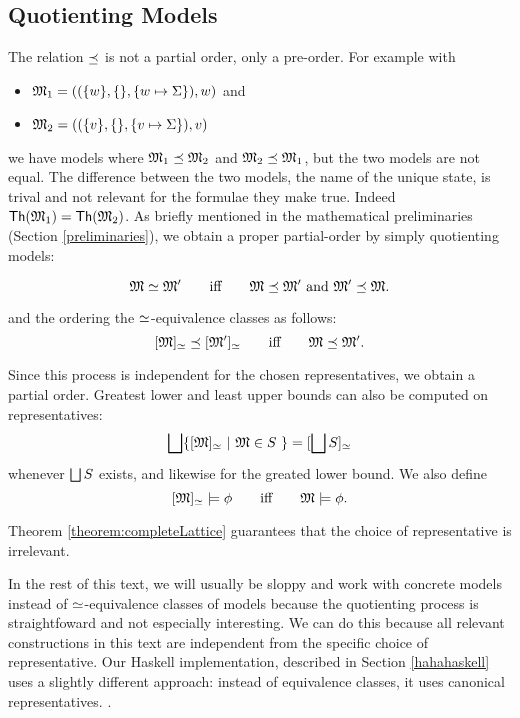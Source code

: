 \subsection{Quotienting Models}

\NI The relation $\preceq$ is not a partial order, only a
pre-order. For example with
\begin{itemize}

\item $\frak{M}_1 = ( (\{w\}, \{\}, \{w \mapsto \Sigma\}), w)$ and
\item $\frak{M}_2 = ( (\{v\}, \{\}, \{v \mapsto \Sigma\}), v)$ 

\end{itemize}

\NI we have models where $\frak{M}_1 \preceq \frak{M}_2$ and $\frak{M}_2
\preceq \frak{M}_1$, but the two models are not equal. The difference
between the two models, the name of the unique state, is trival and
not relevant for the formulae they make true. Indeed $\mathsf{Th}(\frak{M}_1)
= \mathsf{Th}(\frak{M}_2)$.  As briefly mentioned in the mathematical
preliminaries (Section \ref{preliminaries}), we obtain a proper
partial-order by simply quotienting models:

\[
   \frak{M} \simeq \frak{M}'
      \qquad\text{iff}\qquad
   \frak{M} \preceq \frak{M}' \ \text{and}\ \frak{M}' \preceq \frak{M}.
\]

\NI and the ordering the $\simeq$-equivalence classes as follows:
\[
    [\frak{M}]_{\simeq} \preceq [\frak{M}']_{\simeq}
      \qquad\text{iff}\qquad
    \frak{M} \preceq \frak{M}'.
\]

\NI Since this process is independent for the chosen representatives,
we obtain a partial order. Greatest lower and least upper bounds can also
be computed on representatives:
\[
   \bigsqcup \{[\frak{M}]_{\simeq} \ |\ \frak{M} \in S\ \} = [\bigsqcup S]_{\simeq}
\]
whenever $\bigsqcup S$ exists, and likewise for the greated lower bound.
We also define 
\[
   [\frak{M}]_{\simeq} \models \phi 
      \qquad\text{iff}\qquad
   \frak{M} \models \phi.
\]

\NI Theorem \ref{theorem:completeLattice} guarantees that the choice
of representative is irrelevant.

In the rest of this text, we will usually be sloppy and work with
concrete models instead of $\simeq$-equivalence classes of models
because the quotienting process is straightfoward and not especially
interesting. We can do this because all relevant constructions in this
text are independent from the specific choice of representative.  Our
Haskell implementation, described in Section \ref{hahahaskell} uses a
slightly different approach: instead of equivalence classes, it uses
canonical representatives.  .

